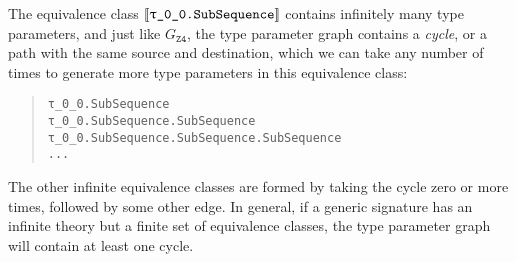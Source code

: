 \documentclass[../generics]{subfiles}
\begin{document}
\begin{example}
\begin{center}
\begin{tikzpicture}[x=3.2cm,y=1.3cm]
\end{tikzpicture}
\end{center}
The equivalence class $\archetype{\rT.SubSequence}$ contains infinitely many type parameters, and just like $G_\texttt{Z4}$, the type parameter graph contains a \emph{cycle}, or a path with the same source and destination, which we can take any number of times to generate more type parameters in this equivalence class:
\begin{quote}
\begin{verbatim}
τ_0_0.SubSequence
τ_0_0.SubSequence.SubSequence
τ_0_0.SubSequence.SubSequence.SubSequence
...
\end{verbatim}
\end{quote}
The other infinite equivalence classes are formed by taking the cycle zero or more times, followed by some other edge. In general, if a generic signature has an infinite theory but a finite set of equivalence classes, the type parameter graph will contain at least one cycle.
\end{example}
\end{document}
